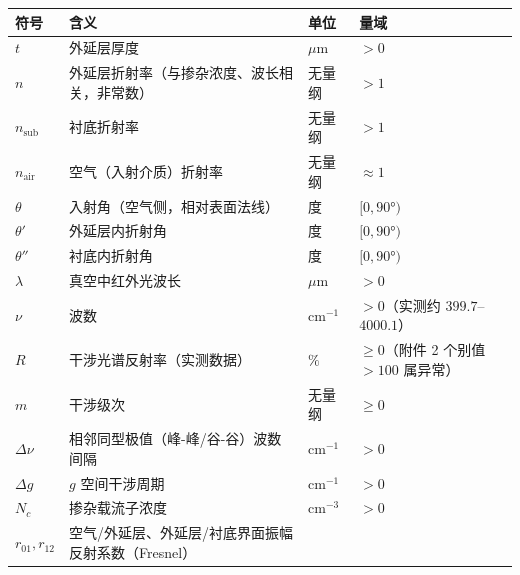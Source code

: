 \begin{longtable}[]{@{}
  >{\raggedright\arraybackslash}p{}
  >{\raggedright\arraybackslash}p{}
  >{\raggedright\arraybackslash}p{}
  >{\raggedright\arraybackslash}p{}@{}}
\toprule\noalign{}
\begin{minipage}[b]{\linewidth}\raggedright
符号
\end{minipage} & \begin{minipage}[b]{\linewidth}\raggedright
含义
\end{minipage} & \begin{minipage}[b]{\linewidth}\raggedright
单位
\end{minipage} & \begin{minipage}[b]{\linewidth}\raggedright
量域
\end{minipage} \\
\midrule\noalign{}
\endhead
\bottomrule\noalign{}
\endlastfoot
\(t\) & 外延层厚度 & \(\mu\mathrm{m}\) & \(>0\) \\
\(n\) & 外延层折射率（与掺杂浓度、波长相关，非常数） & 无量纲 &
\(>1\) \\
\(n_{\mathrm{sub}}\) & 衬底折射率 & 无量纲 & \(>1\) \\
\(n_{\mathrm{air}}\) & 空气（入射介质）折射率 & 无量纲 & \(\approx1\) \\
\(\theta\) & 入射角（空气侧，相对表面法线） & 度 & \([0,90°)\) \\
\(\theta'\) & 外延层内折射角 & 度 & \([0,90°)\) \\
\(\theta''\) & 衬底内折射角 & 度 & \([0,90°)\) \\
\(\lambda\) & 真空中红外光波长 & \(\mu\mathrm{m}\) & \(>0\) \\
\(\nu\) & 波数 & \(\mathrm{cm}^{-1}\) & \(>0\)（实测约
\(399.7\)--\(4000.1\)） \\
\(R\) & 干涉光谱反射率（实测数据） & \(\%\) & \(\ge0\)（附件 2 个别值
\(>100\) 属异常） \\
\(m\) & 干涉级次 & 无量纲 & \(\ge0\) \\
\(\Delta\nu\) & 相邻同型极值（峰-峰/谷-谷）波数间隔 &
\(\mathrm{cm}^{-1}\) & \(>0\) \\
\(\Delta g\) & \(g\) 空间干涉周期 & \(\mathrm{cm}^{-1}\) & \(>0\) \\
\(N_c\) & 掺杂载流子浓度 & \(\mathrm{cm}^{-3}\) & \(>0\) \\
\(r_{01},r_{12}\) & 空气/外延层、外延层/衬底界面振幅反射系数（Fresnel）

\end{longtable}
